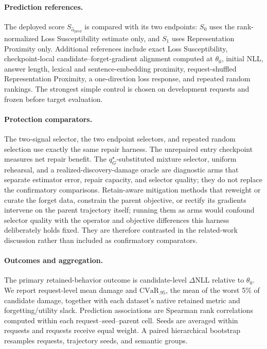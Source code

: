 \paragraph{Prediction references.}
The deployed score $S_{\widehat\alpha_{\mathrm{pred}}}$ is compared with its
two endpoints: $S_0$ uses the rank-normalized Loss Susceptibility
estimate only, and $S_1$ uses Representation Proximity only. Additional references include exact
Loss Susceptibility, checkpoint-local candidate--forget-gradient
alignment computed at $\theta_0$, initial NLL, answer length, lexical and
sentence-embedding proximity, request-shuffled
Representation Proximity, a one-direction loss response, and repeated random
rankings. The strongest simple control is chosen on development requests and
frozen before target evaluation.

\paragraph{Protection comparators.}
The two-signal selector, the two endpoint selectors, and repeated random
selection use exactly the same repair harness. The unrepaired entry checkpoint
measures net repair benefit. The $q_G^\star$-substituted mixture selector,
uniform rehearsal, and a
realized-discovery-damage oracle are diagnostic arms that separate estimator
error, repair capacity, and selector quality; they do not replace the
confirmatory comparisons.
Retain-aware mitigation methods that reweight or curate the forget data,
constrain the parent objective, or rectify its gradients intervene on the
parent trajectory itself; running them as arms would confound selector quality
with the operator and objective differences this harness deliberately holds
fixed. They are therefore contrasted in the related-work discussion rather
than included as confirmatory comparators.

\paragraph{Outcomes and aggregation.}
The primary retained-behavior outcome is candidate-level $\Delta$NLL relative
to $\theta_0$. We report request-level mean damage and
$\mathrm{CVaR}_{.95}$, the mean of the worst 5\% of candidate damage, together
with each dataset's native retained metric and forgetting/utility slack.
Prediction associations are Spearman rank correlations computed within each
request--seed--parent cell. Seeds are averaged within requests and requests
receive equal weight. A paired hierarchical bootstrap resamples requests,
trajectory seeds, and semantic groups.

